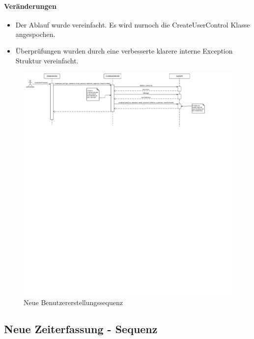     \paragraph{Veränderungen}
        \begin{itemize}
            \item Der Ablauf wurde vereinfacht. Es wird nurnoch die CreateUserControl Klasse angespochen.
            \item Überprüfungen wurden durch eine verbesserte klarere interne Exception Struktur vereinfacht.
        \end{itemize}

    \begin{figure}
      \centering
        \includegraphics[width=\linewidth]{Create-user-account-new.svg}
       \caption{Neue Benutzererstellungssequenz}
    \end{figure}

\subsection{Neue Zeiterfassung - Sequenz}

